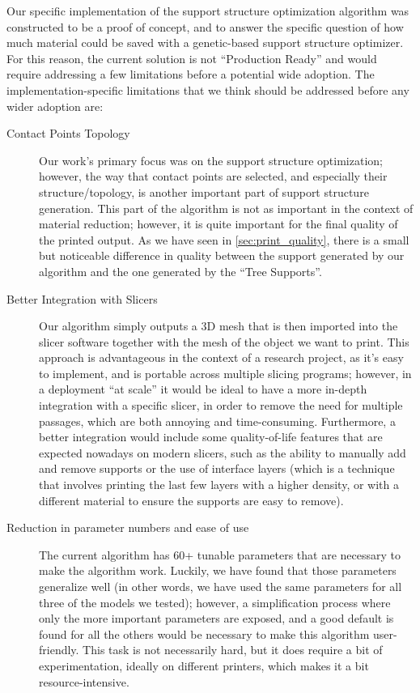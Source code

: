 Our specific implementation of the support structure optimization algorithm was constructed 
to be a proof of concept, and to answer the specific question of how much material could be saved
with a genetic-based support structure optimizer. For this reason, the current solution is not ``Production Ready''
and would require addressing a few limitations before a potential wide adoption. The implementation-specific
limitations that we think should be addressed before any wider adoption are:

\begin{description}
    \item[Contact Points Topology] Our work's primary focus was on the support structure optimization;
    however, the way that contact points are selected, and especially their structure/topology, is another important
    part of support structure generation. This part of the algorithm is not as important in the context of material
    reduction; however, it is quite important for the final quality of the printed output.
    As we have seen in \cref{sec:print_quality}, there is a small but noticeable difference in quality
    between the support generated by our algorithm and the one generated by the ``Tree Supports''.
    \item[Better Integration with Slicers] Our algorithm simply outputs a 3D mesh that is then imported
    into the slicer software together with the mesh of the object we want to print. This approach is 
    advantageous in the context of a research project, as it's easy to implement, and is portable across
    multiple slicing programs; however, in a deployment ``at scale'' it would be ideal to have a more in-depth
    integration with a specific slicer, in order to remove the need for multiple passages, which are both
    annoying and time-consuming.
    Furthermore, a better integration would include some quality-of-life features that are expected nowadays
    on modern slicers, such as the ability to manually add and remove supports or the use of interface layers
    (which is a technique that involves printing the last few layers with a higher density, or with a different material
    to ensure the supports are easy to remove).
    \item[Reduction in parameter numbers and ease of use] The current algorithm has 60+ tunable parameters
    that are necessary to make the algorithm work. Luckily, we have found that those parameters generalize well
    (in other words, we have used the same parameters for all three of the models we tested); however,
    a simplification process where only the more important parameters are exposed, and a good default is found
    for all the others would be necessary to make this algorithm user-friendly. This task is not necessarily
    hard, but it does require a bit of experimentation, ideally on different printers, which makes it
    a bit resource-intensive.
\end{description}

